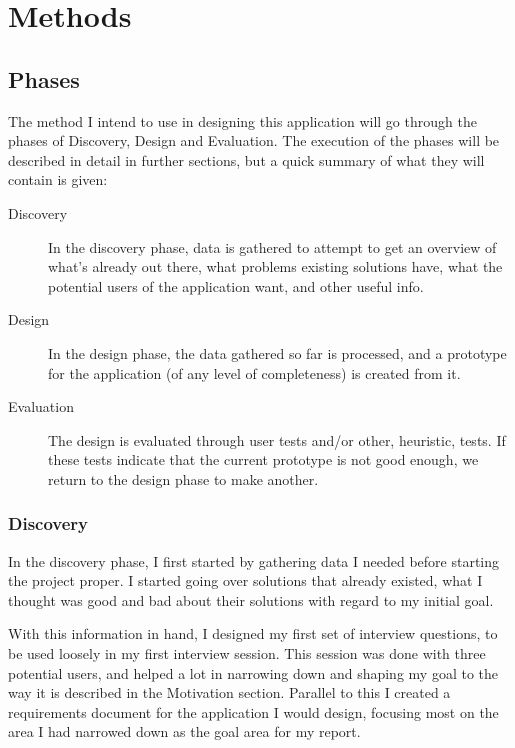 \documentclass[]{report}
\begin{document}
\chapter{Methods}

\section{Phases}

The method I intend to use in designing this application will go through the
phases of Discovery, Design and Evaluation. The execution of the phases will be
described in detail in further sections, but a quick summary of what they will
contain is given:

\begin{description}
\item[Discovery] In the discovery phase, data is gathered to attempt to get an
  overview of what's already out there, what problems existing solutions have,
  what the potential users of the application want, and other useful info.
\item[Design] In the design phase, the data gathered so far is processed, and a
  prototype for the application (of any level of completeness) is created from
  it.
\item[Evaluation] The design is evaluated through user tests and/or other,
  heuristic, tests. If these tests indicate that the current prototype is not
  good enough, we return to the design phase to make another.
\end{description}

\subsection{Discovery}

In the discovery phase, I first started by gathering data I needed before
starting the project proper. I started going over solutions that already
existed, what I thought was good and bad about their solutions with regard to my
initial goal.

With this information in hand, I designed my first set of interview questions,
to be used loosely in my first interview session. This session was done with
three potential users, and helped a lot in narrowing down and shaping my goal
to the way it is described in the Motivation section. Parallel to this I created
a requirements document for the application I would design, focusing most on the
area I had narrowed down as the goal area for my report.
\end{document}
